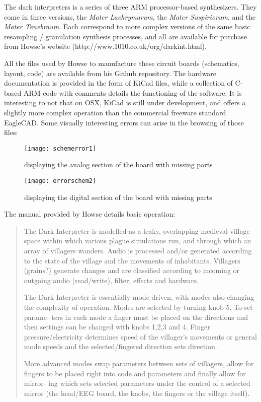 The dark interpreters is a series of three ARM processor-based synthesizers. They come in three versions, the \emph{Mater Lachrymarum}, the \emph{Mater Suspiriorum}, and the \emph{Mater Tenebraum}. Each correspond to more complex versions of the same basic resampling / granulation synthesis processes, and all are available for purchase from Howse's website (http://www.1010.co.uk/org/darkint.html). 

All the files used by Howse to manufacture these circuit boards (schematics, layout, code) are available from his Github repository. The hardware documentation is provided in the form of KiCad files, while a collection of C-based ARM code with comments details the functioning of the software. It is interesting to not that on OSX, KiCad is still under development, and offers a slightly more complex operation than the commercial freeware standard EagleCAD. Some visually interesting errors can arise in the browsing of those files: 

	\begin{figure}[h!]
	  \caption{displaying the analog section of the board with missing parts}
	  \centering
	    \texttt{[image: schemerror1]}
	\end{figure}
	
	\begin{figure}[h!]
	  \caption{displaying the digital section of the board with missing parts}
	  \centering
	    \texttt{[image: errorschem2]}
	\end{figure}
	
The manual provided by Howse details basic operation: 

\begin{quote}

The Dark Interpreter is modelled as a leaky, overlapping medieval village space within which various plague simulations run, and through which an array of villagers wanders. Audio is processed and/or generated according to the state of the village and the movements of inhabitants. Villagers (grains?) generate changes and are classified according to incoming or outgoing audio (read/write), filter, effects and hardware.

The Dark Interpreter is essentially mode driven, with modes also changing the complexity of operation. Modes are selected by turning knob 5. To set parame- ters in each mode a finger must be placed on the directions and then settings can be changed with knobs 1,2,3 and 4. Finger pressure/electricity determines speed of the villager’s movements or general mode speeds and the selected/fingered direction sets direction.

More advanced modes swap parameters between sets of villagers, allow for fingers to be placed right into code and parameters and finally allow for mirror- ing which sets selected parameters under the control of a selected mirror (the head/EEG board, the knobs, the fingers or the village itself).

\end{quote}

